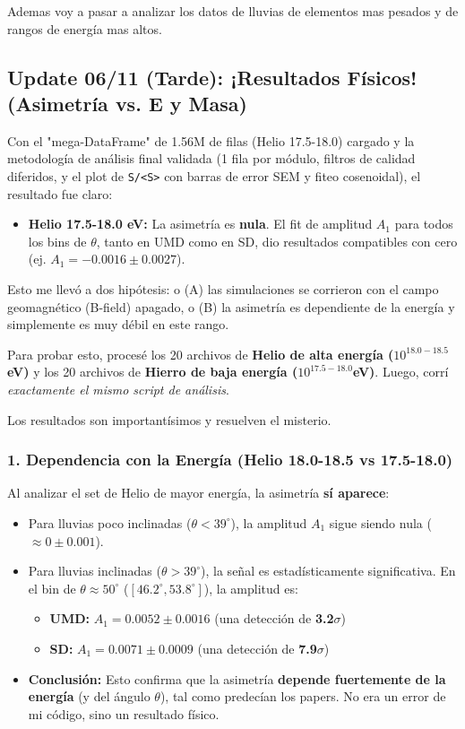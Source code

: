 Ademas voy a pasar a analizar los datos de lluvias de elementos mas pesados y de rangos de energía mas altos.

\subsection*{Update 06/11 (Tarde): ¡Resultados Físicos! (Asimetría vs. E y Masa)}

Con el "mega-DataFrame" de 1.56M de filas (Helio 17.5-18.0) cargado y la metodología de análisis final validada (1 fila por módulo, filtros de calidad diferidos, y el plot de \lstinline|S/<S>| con barras de error SEM y fiteo cosenoidal), el resultado fue claro:

\begin{itemize}
	\item \textbf{Helio \@ 17.5-18.0 eV:} La asimetría es \textbf{nula}. El fit de amplitud $A_1$ para todos los bins de $\theta$, tanto en UMD como en SD, dio resultados compatibles con cero (ej. $A_1 = -0.0016 \pm 0.0027$).
\end{itemize}

Esto me llevó a dos hipótesis: o (A) las simulaciones se corrieron con el campo geomagnético (B-field) apagado, o (B) la asimetría es dependiente de la energía y simplemente es muy débil en este rango.

Para probar esto, procesé los 20 archivos de \textbf{Helio de alta energía ($10^{18.0-18.5}$eV)} y los 20 archivos de \textbf{Hierro de baja energía ($10^{17.5-18.0}$eV)}. Luego, corrí \textit{exactamente el mismo script de análisis}.

Los resultados son importantísimos y resuelven el misterio.

\subsubsection*{1. Dependencia con la Energía (Helio 18.0-18.5 vs 17.5-18.0)}
Al analizar el set de Helio de mayor energía, la asimetría \textbf{sí aparece}:
\begin{itemize}
	\item Para lluvias poco inclinadas ($\theta < 39^\circ$), la amplitud $A_1$ sigue siendo nula ($\approx 0 \pm 0.001$).
	\item Para lluvias inclinadas ($\theta > 39^\circ$), la señal es estadísticamente significativa. En el bin de $\theta \approx 50^\circ$ ($[46.2^\circ, 53.8^\circ]$), la amplitud es:
	\begin{itemize}
		\item \textbf{UMD:} $A_1 = 0.0052 \pm 0.0016$ (una detección de \textbf{3.2$\sigma$})
		\item \textbf{SD:} $A_1 = 0.0071 \pm 0.0009$ (una detección de \textbf{7.9$\sigma$})
	\end{itemize}
	\item \textbf{Conclusión:} Esto confirma que la asimetría \textbf{depende fuertemente de la energía} (y del ángulo $\theta$), tal como predecían los papers. No era un error de mi código, sino un resultado físico.
\end{itemize}

